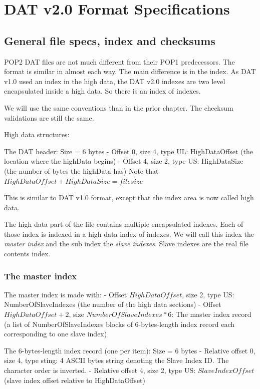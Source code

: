 \documentclass{article}
\begin{document}
\section{DAT v2.0 Format Specifications}

\subsection{General file specs, index and checksums}
 POP2 DAT files are not much different from their POP1 predecessors.
 The format is similar in almost each way. The main difference is in the
 index. As DAT v1.0 used an index in the high data, the DAT v2.0 indexes
 are two level encapsulated inside a high data. So there is an index of
 indexes.

 We will use the same conventions than in the prior chapter.
 The checksum validations are still the same.

 High data structures:

 The DAT header: Size = 6 bytes
  - Offset 0, size 4, type UL: HighDataOffset
           (the location where the highData begins)
  - Offset 4, size 2, type US: HighDataSize
           (the number of bytes the highData has)
           Note that $HighDataOffset+HighDataSize=file size$

 This is similar to DAT v1.0 format, except that the index area is now
 called high data.

 The high data part of the file contains multiple encapsulated indexes.
 Each of those index is indexed in a high data index of indexes. We will
 call this index the  {\it master index} and the sub index the  {\it slave indexes}.
 Slave indexes are the real file contents index.

\subsubsection{The master index} %
 The master index is made with:
  - Offset $HighDataOffset$,   size 2, type US: NumberOfSlaveIndexes
           (the number of the high data sections)
  - Offset $HighDataOffset+2$, size $NumberOfSlaveIndexes*6$: The master index
           record (a list of NumberOfSlaveIndexes blocks of 6-bytes-length
           index record each corresponding to one slave index)

 The 6-bytes-length index record (one per item): Size = 6 bytes
  - Relative offset 0, size 4, type sting: 4 ASCII bytes string denoting
           the Slave Index ID. The character order is inverted.
  - Relative offset 4, size 2, type US: $SlaveIndexOffset$
           (slave index offset relative to HighDataOffset)
\end{document}
